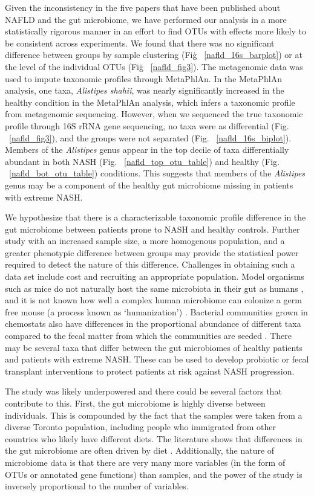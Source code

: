 Given the inconsistency in the five papers that have been published about NAFLD and the gut microbiome, we have performed our analysis in a more statistically rigorous manner in an effort to find OTUs with effects more likely to be consistent across experiments. We found that there was no significant difference between groups by sample clustering (Fig\. ~\ref{nafld_16s_barplot}) or at the level of the individual OTUs (Fig\. ~\ref{nafld_fig3}). The metagenomic data was used to impute taxonomic profiles through MetaPhlAn. In the MetaPhlAn analysis, one taxa, \textit{Alistipes shahii}, was nearly significantly increased in the healthy condition in the MetaPhlAn analysis, which infers a taxonomic profile from metagenomic sequencing. However, when we sequenced the true taxonomic profile through 16S rRNA gene sequencing, no taxa were as differential (Fig. ~\ref{nafld_fig3}), and the groups were not separated (Fig. ~\ref{nafld_16s_biplot}). Members of the \textit{Alistipes} genus appear in the top decile of taxa differentially abundant in both NASH (Fig. ~\ref{nafld_top_otu_table}) and healthy (Fig. ~\ref{nafld_bot_otu_table}) conditions. This suggests that members of the \textit{Alistipes} genus may be a component of the healthy gut microbiome missing in patients with extreme NASH.

We hypothesize that there is a characterizable taxonomic profile difference in the gut microbiome between patients prone to NASH and healthy controls. Further study with an increased sample size, a more homogenous population, and a greater phenotypic difference between groups may provide the statistical power required to detect the nature of this difference. Challenges in obtaining such a data set include cost and recruiting an appropriate population. Model organisms such as mice do not naturally host the same microbiota in their gut as humans \cite{nguyen2015informative}, and it is not known how well a complex human microbiome can colonize a germ free mouse (a process known as `humanization') \cite{clavel2016mouse}. Bacterial communities grown in chemostats also have differences in the proportional abundance of different taxa compared to the fecal matter from which the communities are seeded \cite{mcdonald2013evaluation}. There may be several taxa that differ between the gut microbiomes of healthy patients and patients with extreme NASH. These can be used to develop probiotic or fecal transplant interventions to protect patients at risk against NASH progression.

The study was likely underpowered and there could be several factors that contribute to this. First, the gut microbiome is highly diverse between individuals. This is compounded by the fact that the samples were taken from a diverse Toronto population, including people who immigrated from other countries who likely have different diets. The literature shows that differences in the gut microbiome are often driven by diet \cite{david2014diet}. Additionally, the nature of microbiome data is that there are very many more variables (in the form of OTUs or annotated gene functions) than samples, and the power of the study is inversely proportional to the number of variables.

